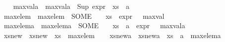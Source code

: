 \begin{isabellebody}
\ \ \isamarkupfalse%
\ max{\isacharunderscore}{\kern0pt}val{\isacharunderscore}{\kern0pt}a\ \ {\isachardoublequoteopen}max{\isacharunderscore}{\kern0pt}val{\isacharunderscore}{\kern0pt}a\ {\isacharequal}{\kern0pt}\ {\isacharparenleft}{\kern0pt}Sup\ {\isacharparenleft}{\kern0pt}expr{\isacharunderscore}{\kern0pt}{}\ {\isacharbackquote}{\kern0pt}\ {\isacharparenleft}{\kern0pt}xs\ {\isasymunion}\ {\isacharbraceleft}{\kern0pt}a{\isacharbraceright}{\kern0pt}{\isacharparenright}{\kern0pt}{\isacharparenright}{\kern0pt}{\isacharparenright}{\kern0pt}{\isachardoublequoteclose}\isanewline
\ \ \isamarkupfalse%
\ max{\isacharunderscore}{\kern0pt}elem\ \ {\isachardoublequoteopen}max{\isacharunderscore}{\kern0pt}elem\ {\isacharequal}{\kern0pt}\ {\isacharparenleft}{\kern0pt}SOME\ {\isasympsi}{\isachardot}{\kern0pt}\ {\isasympsi}\ {\isasymin}\ xs\ {\isasymand}\ expr{\isacharunderscore}{\kern0pt}{}\ {\isasympsi}\ {\isacharequal}{\kern0pt}\ max{\isacharunderscore}{\kern0pt}val{\isacharparenright}{\kern0pt}{\isachardoublequoteclose}\isanewline
\ \ \isamarkupfalse%
\ max{\isacharunderscore}{\kern0pt}elem{\isacharunderscore}{\kern0pt}a\ \ {\isachardoublequoteopen}max{\isacharunderscore}{\kern0pt}elem{\isacharunderscore}{\kern0pt}a\ {\isacharequal}{\kern0pt}\ {\isacharparenleft}{\kern0pt}SOME\ {\isasympsi}{\isachardot}{\kern0pt}\ {\isasympsi}\ {\isasymin}\ {\isacharparenleft}{\kern0pt}xs\ {\isasymunion}\ {\isacharbraceleft}{\kern0pt}a{\isacharbraceright}{\kern0pt}{\isacharparenright}{\kern0pt}\ {\isasymand}\ expr{\isacharunderscore}{\kern0pt}{}\ {\isasympsi}\ {\isacharequal}{\kern0pt}\ max{\isacharunderscore}{\kern0pt}val{\isacharunderscore}{\kern0pt}a{\isacharparenright}{\kern0pt}{\isachardoublequoteclose}\isanewline
\ \ \isamarkupfalse%
\ xs{\isacharunderscore}{\kern0pt}new\ \ {\isachardoublequoteopen}xs{\isacharunderscore}{\kern0pt}new\ {\isacharequal}{\kern0pt}\ xs\ {\isacharminus}{\kern0pt}\ {\isacharbraceleft}{\kern0pt}max{\isacharunderscore}{\kern0pt}elem{\isacharbraceright}{\kern0pt}{\isachardoublequoteclose}\isanewline
\ \ \isamarkupfalse%
\ xs{\isacharunderscore}{\kern0pt}new{\isacharunderscore}{\kern0pt}a\ \ {\isachardoublequoteopen}xs{\isacharunderscore}{\kern0pt}new{\isacharunderscore}{\kern0pt}a\ {\isacharequal}{\kern0pt}\ {\isacharparenleft}{\kern0pt}xs\ {\isasymunion}\ {\isacharbraceleft}{\kern0pt}a{\isacharbraceright}{\kern0pt}{\isacharparenright}{\kern0pt}\ {\isacharminus}{\kern0pt}\ {\isacharbraceleft}{\kern0pt}max{\isacharunderscore}{\kern0pt}elem{\isacharunderscore}{\kern0pt}a{\isacharbraceright}{\kern0pt}{\isachardoublequoteclose}\isanewline

\end{isabellebody}
